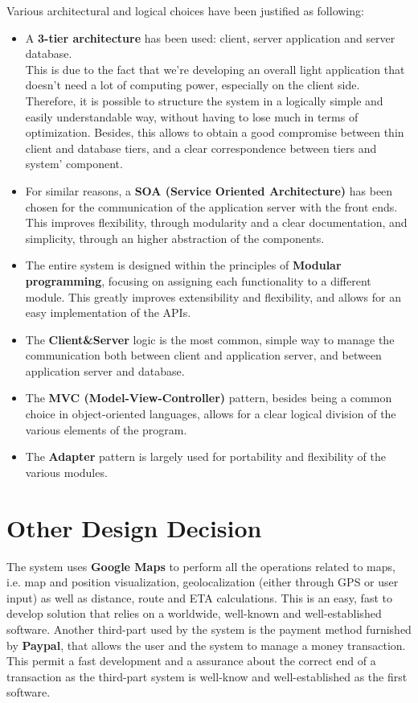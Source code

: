 Various architectural and logical choices have been justified as following:

\begin{itemize}

	\item A \textbf{3-tier architecture} has been used: client, server application and server database.\\
	This is due to the fact that we're developing an overall light application that doesn't need a lot of computing power, especially on the client side. Therefore, it is possible to structure the system in a logically simple and easily understandable way, without having to lose much in terms of optimization. Besides, this allows to obtain a good compromise between thin client and database tiers, and a clear correspondence between tiers and system' component.

	\item For similar reasons, a \textbf{SOA (Service Oriented Architecture)} has been chosen for the communication of the application server with the front ends. This improves flexibility, through modularity and a clear documentation, and simplicity, through an higher abstraction of the components.

	\item The entire system is designed within the principles of \textbf{Modular programming}, focusing on assigning each functionality to a different module. This greatly improves extensibility and flexibility, and allows for an easy implementation of the APIs.

	\item The \textbf{Client\&Server} logic is the most common, simple way to manage the communication both between client and application server, and between application server and database.

	\item The \textbf{MVC (Model-View-Controller)} pattern, besides being a common choice in object-oriented languages, allows for a clear logical division of the various elements of the program.

	\item The \textbf{Adapter} pattern is largely used for portability and flexibility of the various modules.

\end{itemize}

\section{Other Design Decision}
The system uses \textbf{Google Maps} to perform all the operations related to maps, i.e. map and position visualization, geolocalization (either through GPS or user input) as well as distance, route and ETA calculations. This is an easy, fast to develop solution that relies on a worldwide, well-known and well-established software. Another third-part used by the system is the payment method furnished by \textbf{Paypal}, that allows the user and the system to manage a money transaction. This permit a fast development and a assurance about the correct end of a transaction as the third-part system is well-know and well-established as the first software. 
